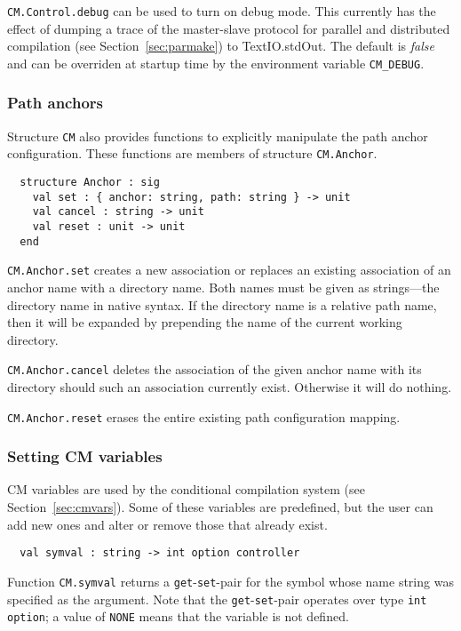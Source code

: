\documentclass{article}
\begin{document}
{\tt CM.Control.debug} can be used to turn on debug mode.  This
currently has the effect of dumping a trace of the master-slave
protocol for parallel and distributed compilation (see
Section~\ref{sec:parmake}) to TextIO.stdOut. The default is {\em
false} and can be overriden at startup time by the environment
variable {\tt CM\_DEBUG}.

\subsubsection*{Path anchors}

Structure {\tt CM} also provides functions to explicitly manipulate
the path anchor configuration.  These functions are members of
structure {\tt CM.Anchor}.

\begin{verbatim}
  structure Anchor : sig
    val set : { anchor: string, path: string } -> unit
    val cancel : string -> unit
    val reset : unit -> unit
  end
\end{verbatim}

{\tt CM.Anchor.set} creates a new association or replaces an existing
association of an anchor name with a directory name.  Both names must
be given as strings---the directory name in native syntax.  If the
directory name is a relative path name, then it will be expanded by
prepending the name of the current working directory.

{\tt CM.Anchor.cancel} deletes the association of the given anchor name
with its directory should such an association currently exist.
Otherwise it will do nothing.

{\tt CM.Anchor.reset} erases the entire existing path configuration
mapping.

\subsubsection*{Setting CM variables}

CM variables are used by the conditional compilation system (see
Section~\ref{sec:cmvars}).   Some of these variables are predefined,
but the user can add new ones and alter or remove those that already
exist.

\begin{verbatim}
  val symval : string -> int option controller
\end{verbatim}

Function {\tt CM.symval} returns a {\tt get}-{\tt set}-pair for the
symbol whose name string was specified as the argument.  Note that the
{\tt get}-{\tt set}-pair operates over type {\tt int option}; a value
of {\tt NONE} means that the variable is not defined.
\end{document}
